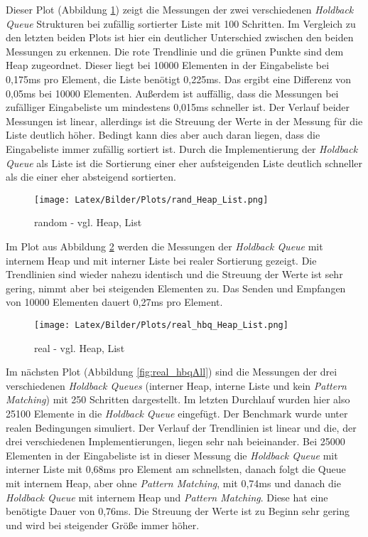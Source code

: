 Dieser Plot (Abbildung \ref{fig:rand_heapList}) zeigt die Messungen der zwei verschiedenen \textit{Holdback Queue} Strukturen bei zufällig sortierter Liste mit 100 Schritten. Im Vergleich zu den letzten beiden Plots ist hier ein deutlicher Unterschied zwischen den beiden Messungen zu erkennen. Die rote Trendlinie und die grünen Punkte sind dem Heap zugeordnet. Dieser liegt bei 10000 Elementen in der Eingabeliste bei 0,175ms pro Element, die Liste benötigt 0,225ms. Das ergibt eine Differenz von 0,05ms bei 10000 Elementen. Außerdem ist auffällig, dass die Messungen bei zufälliger Eingabeliste um mindestens 0,015ms schneller ist. Der Verlauf beider Messungen ist linear, allerdings ist die Streuung der Werte in der Messung für die Liste deutlich höher. Bedingt kann dies aber auch daran liegen, dass die Eingabeliste immer zufällig sortiert ist. Durch die Implementierung der \textit{Holdback Queue} als Liste ist die Sortierung einer eher aufsteigenden Liste deutlich schneller als die einer eher absteigend sortierten. 

\begin{figure}[htbp]
\begin{center}
\texttt{[image: Latex/Bilder/Plots/rand\_Heap\_List.png]}
\caption{\label{fig:rand_heapList} random - vgl. Heap, List} 
\end{center}
\end{figure}

Im Plot aus Abbildung \ref{fig:real_heapList} werden die Messungen der \textit{Holdback Queue} mit internem Heap und mit interner Liste bei realer Sortierung gezeigt. Die Trendlinien sind wieder nahezu identisch und die Streuung der Werte ist sehr gering, nimmt aber bei steigenden Elementen zu. Das Senden und Empfangen von 10000 Elementen dauert 0,27ms pro Element.

\begin{figure}[htbp]
\begin{center}
\texttt{[image: Latex/Bilder/Plots/real\_hbq\_Heap\_List.png]}
\caption{\label{fig:real_heapList} real - vgl. Heap, List} 
\end{center}
\end{figure}

Im nächsten Plot (Abbildung \ref{fig:real_hbqAll}) sind die Messungen der drei verschiedenen \textit{Holdback Queues} (interner Heap, interne Liste und kein \textit{Pattern Matching}) mit 250 Schritten dargestellt. Im letzten Durchlauf wurden hier also 25100 Elemente in die \textit{Holdback Queue} eingefügt. Der Benchmark wurde unter realen Bedingungen simuliert. Der Verlauf der Trendlinien ist linear und die, der drei verschiedenen Implementierungen, liegen sehr nah beieinander. Bei 25000 Elementen in der Eingabeliste ist in dieser Messung die \textit{Holdback Queue} mit interner Liste mit 0,68ms pro Element am schnellsten, danach folgt die Queue mit internem Heap, aber ohne \textit{Pattern Matching}, mit 0,74ms und danach die \textit{Holdback Queue} mit internem Heap und \textit{Pattern Matching}. Diese hat eine benötigte Dauer von 0,76ms. Die Streuung der Werte ist zu Beginn sehr gering und wird bei steigender Größe immer höher.

